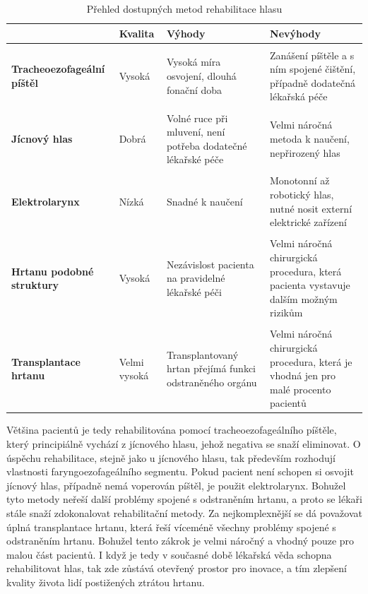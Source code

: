 \begin{table}[ht]
  \centering
  \begin{tabularx}{1.0\textwidth}{L{1.2} L{0.6} L{1.1} L{1.1}}
    & \textbf{Kvalita} & \textbf{Výhody} & \textbf{Nevýhody} \\
    \toprule \\ [-1.75ex]

    \textbf{Tracheoezofageální píštěl} & Vysoká & Vysoká míra osvojení, dlouhá fonační doba & Zanášení píštěle a s ním spojené čištění, případně dodatečná lékařská péče \\
    \midrule \\ [-1.75ex]

    \textbf{Jícnový hlas} & Dobrá & Volné ruce při mluvení, není potřeba dodatečné lékařské péče & Velmi náročná metoda k naučení, nepřirozený hlas \\
    \midrule \\ [-1.75ex]

    \textbf{Elektrolarynx} & Nízká & Snadné k naučení & Monotonní až robotický hlas, nutné nosit externí elektrické zařízení \\
    \midrule \\ [-1.75ex]

    \textbf{Hrtanu podobné struktury} & Vysoká & Nezávislost pacienta na pravidelné lékařské péči & Velmi náročná chirurgická procedura, která pacienta vystavuje dalším možným rizikům  \\
    \midrule \\ [-1.75ex]

    \textbf{Transplantace hrtanu} & Velmi vysoká & Transplantovaný hrtan přejímá funkci odstraněného orgánu & Velmi náročná chirurgická procedura, která je vhodná jen pro malé procento pacientů \\
  \end{tabularx}

  \caption{Přehled dostupných metod rehabilitace hlasu \label{tab:treatment:summary}}
\end{table}

Většina pacientů je tedy rehabilitována pomocí tracheoezofageálního píštěle,
který principiálně vychází z jícnového hlasu, jehož negativa se snaží
eliminovat. O úspěchu rehabilitace, stejně jako u jícnového hlasu, tak
především rozhodují vlastnosti faryngoezofageálního segmentu. Pokud pacient
není schopen si osvojit jícnový hlas, případně nemá voperován píštěl, je
použit elektrolarynx. Bohužel tyto metody neřeší další problémy spojené s
odstraněním hrtanu, a proto se lékaři stále snaží zdokonalovat rehabilitační
metody. Za nejkomplexnější se dá považovat úplná transplantace hrtanu, která
řeší víceméně všechny problémy spojené s odstraněním hrtanu. Bohužel tento
zákrok je velmi náročný a vhodný pouze pro malou část pacientů.
I když je tedy v současné době lékařská věda schopna rehabilitovat hlas, tak
zde zůstává otevřený prostor pro inovace, a tím zlepšení kvality života lidí
postižených ztrátou hrtanu.


